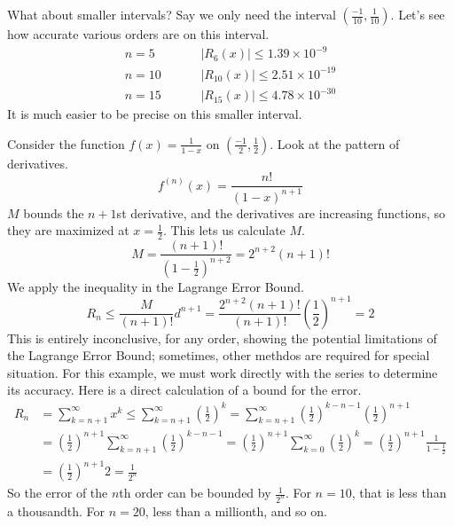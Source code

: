 \documentclass[fleqn,letterpaper]{report}
\begin{document}
\begin{example}
What about smaller intervals? Say we only need the interval $
\left( \frac{-1}{10}, \frac{1}{10} \right)$. Let's see how
accurate various orders are on this interval.
\begin{align*}
n=5 \hspace{1cm} & |R_6(x)| \leq 1.39 \times 10^{-9} \\
n=10 \hspace{1cm} & |R_{10}(x)| \leq 2.51 \times 10^{-19} \\
n=15 \hspace{1cm} & |R_{15}(x)| \leq 4.78 \times 10^{-30}
\end{align*}
It is much easier to be precise on this smaller interval.
\end{example}

\begin{example}
Consider the function $f(x) = \frac{1}{1-x}$ on
$(\frac{-1}{2}, \frac{1}{2})$. Look at the pattern of
derivatives.
\begin{equation*}
f^{(n)}(x) = \frac{n!}{(1-x)^{n+1}}
\end{equation*}
$M$ bounds the $n+1$st derivative, and the derivatives are
increasing functions, so they are maximized at $x =
\frac{1}{2}$. This lets us calculate $M$.
\begin{equation*}
M = \frac{(n+1)!}{(1-\frac{1}{2})^{n+2}} = 2^{n+2}(n+1)!
\end{equation*}
We apply the inequality in the Lagrange Error Bound. 
\begin{equation*}
R_n \leq \frac{M}{(n+1)!}d^{n+1} =
\frac{2^{n+2}(n+1)!}{(n+1)!} \left( \frac{1}{2} \right)^{n+1}
= 2
\end{equation*}
This is entirely inconclusive, for any order, showing the
potential limitations of the Lagrange Error Bound; sometimes,
other methdos are required for special situation. For this
example, we must work directly with the series to determine
its accuracy. Here is a direct calculation of a bound for the
error.
\begin{align*}
R_n & = \sum_{k=n+1}^\infty x^k 
\leq \sum_{k=n+1}^\infty \left( \frac{1}{2} \right)^k 
= \sum_{k=n+1}^\infty \left( \frac{1}{2} \right)^{k-n-1}
\left( \frac{1}{2} \right)^{n+1} \\
& = \left( \frac{1}{2} \right)^{n+1} \sum_{k=n+1}^\infty \left(
\frac{1}{2} \right)^{k-n-1} 
= \left( \frac{1}{2} \right)^{n+1} \sum_{k=0}^\infty \left(
\frac{1}{2} \right)^{k} 
= \left( \frac{1}{2} \right)^{n+1} \frac{1}{1 - \frac{1}{2}}
\\
& = \left( \frac{1}{2} \right)^{n+1} 2 = \frac{1}{2^n}
\end{align*}
So the error of the $n$th order can be bounded by
$\frac{1}{2^n}$. For $n=10$, that is less than a thousandth.
For $n=20$, less than a millionth, and so on.
\end{example}
\end{document}
